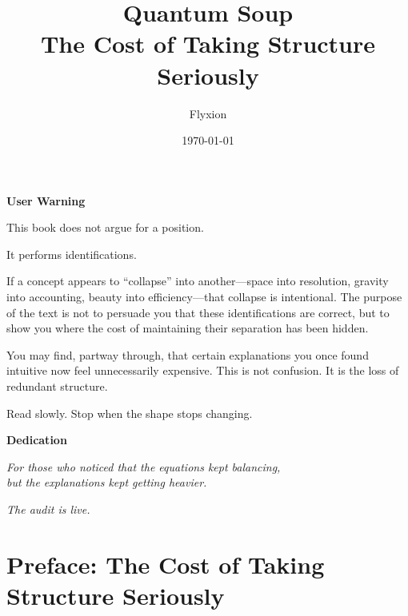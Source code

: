 \documentclass[11pt]{book}
\title{\textbf{Quantum Soup}\\
\vspace{0.5em}
\large The Cost of Taking Structure Seriously}
\author{Flyxion}
\date{\today}
\begin{document}
\frontmatter
\maketitle
\thispagestyle{empty}

\newpage
\thispagestyle{empty}

\begin{center}
\textbf{User Warning}
\end{center}

\vspace{1em}

This book does not argue for a position.

It performs identifications.

If a concept appears to \enquote{collapse} into another---space into resolution, gravity into accounting, beauty into efficiency---that collapse is intentional. The purpose of the text is not to persuade you that these identifications are correct, but to show you where the cost of maintaining their separation has been hidden.

You may find, partway through, that certain explanations you once found intuitive now feel unnecessarily expensive. This is not confusion. It is the loss of redundant structure.

Read slowly. Stop when the shape stops changing.

\vspace{4em}

\begin{center}
\textbf{Dedication}
\end{center}

\vspace{1em}

\begin{center}
\emph{For those who noticed that the equations kept balancing,\\
but the explanations kept getting heavier.}
\end{center}

\newpage
\thispagestyle{empty}

\begin{center}
\emph{The audit is live.}
\end{center}

\newpage
\chapter*{Preface: The Cost of Taking Structure Seriously}
\end{document}
